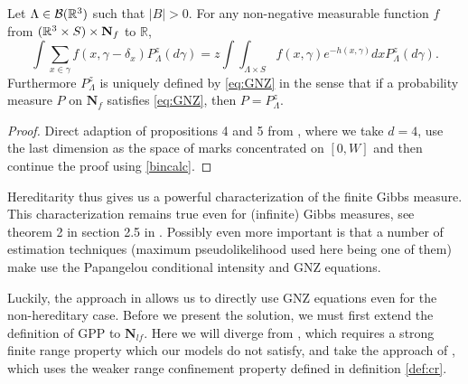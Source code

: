 \begin{proposition} Let $\Lambda \in \mathcal B({\mathbb R^3})$ such that $|B|>0$. For any non-negative measurable function $f$ from $({\mathbb R^3}\times S)\times \mathbf N_f$ to $\mathbb R$,
	\begin{equation}\label{eq:GNZ}\int \sum_{x \in \gamma} f(x,\gamma- \delta_x) P^z_\Lambda (d\gamma) = z \int \int_{\Lambda\times S} f(x,\gamma) e^{-h(x,\gamma)} dx P^z_\Lambda (d\gamma).\end{equation}
	Furthermore $P^z_\Lambda$ is uniquely defined by \ref{eq:GNZ} in the sense that if a probability measure $P$ on $\mathbf N_f$ satisfies \ref{eq:GNZ}, then $P=P^z_\Lambda$.
\end{proposition}
\begin{proof}
	Direct adaption of propositions 4 and 5 from \cite{Dereudre2017}, where we take $d=4$, use the last dimension as the space of marks concentrated on $[0,W]$ and then continue the proof using \ref{bincalc}. 
\end{proof}

Hereditarity thus gives us a powerful characterization of the finite Gibbs measure. This characterization remains true even for (infinite) Gibbs measures, see theorem 2 in section 2.5 in \cite{Dereudre2017}. Possibly even more important is that a number of estimation techniques (maximum pseudolikelihood used here being one of them) make use the Papangelou conditional intensity and GNZ equations.
 
Luckily, the approach in  \cite{DereudreLavancier2007} allows us to directly use GNZ equations even for the non-hereditary case. Before we present the solution, we must first extend the definition of GPP to $\mathbf N_{lf}$. Here we will diverge from \cite{Dereudre2017}, which requires a strong finite range property which our models do not satisfy, and take the approach of \cite{DDG12}, which uses the weaker range confinement property defined in definition \ref{def:cr}. 


